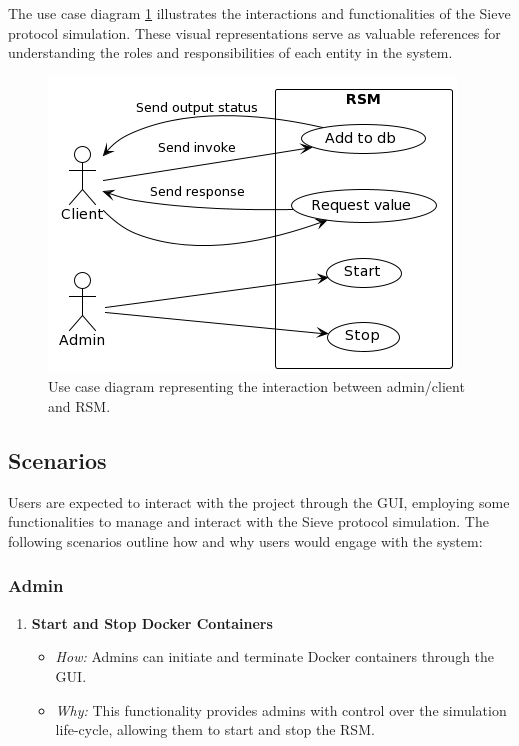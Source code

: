 \documentclass{scrartcl}
\begin{document}
The use case diagram \ref{fig:use-cases} illustrates the interactions and functionalities of the Sieve protocol simulation. These visual representations serve as valuable references for understanding the roles and responsibilities of each entity in the system.

\begin{figure}[H]
    \centering
    \includegraphics[width=.6\linewidth]{figures/use-cases.png}
    \caption{Use case diagram representing the interaction between admin/client and RSM.}
    \label{fig:use-cases} 
\end{figure}


\subsection{Scenarios}

Users are expected to interact with the project through the GUI, employing some functionalities to manage and interact with the Sieve protocol simulation. The following scenarios outline how and why users would engage with the system:

\subsubsection{Admin}

\begin{enumerate}
    \item \textbf{Start and Stop Docker Containers}
        \begin{itemize}
            \item \textit{How:} Admins can initiate and terminate Docker containers through the GUI.
            \item \textit{Why:} This functionality provides admins with control over the simulation life-cycle, allowing them to start and stop the RSM.
        \end{itemize}
\end{enumerate}
\end{document}
